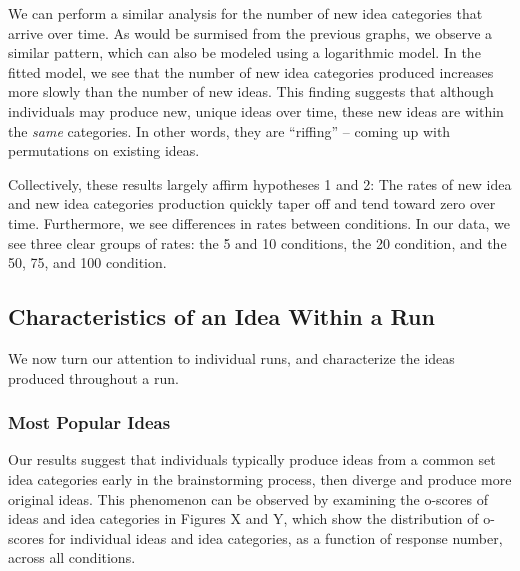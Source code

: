 
We can perform a similar analysis for the number of new idea categories that arrive over time. As would be surmised from the previous graphs, we observe a similar pattern, which can also be modeled using a logarithmic model. In the fitted model, we see that the number of new idea categories produced increases more slowly than the number of new ideas. This finding suggests that although individuals may produce new, unique ideas over time, these new ideas are within the \emph{same} categories. In other words, they are ``riffing'' -- coming up with permutations on existing ideas.

Collectively, these results largely affirm hypotheses 1 and 2: The rates of new idea and new idea categories production quickly taper off and tend toward zero over time. Furthermore, we see differences in rates between conditions. In our data, we see three clear groups of rates: the 5 and 10 conditions, the 20 condition, and the 50, 75, and 100 condition.



\subsection{Characteristics of an Idea Within a Run}
We now turn our attention to individual runs, and characterize the ideas produced throughout a run.

\subsubsection{Most Popular Ideas}
Our results suggest that individuals typically produce ideas from a common set idea categories early in the brainstorming process, then diverge and produce more original ideas. This phenomenon can be observed by examining the o-scores of ideas and idea categories in Figures X and Y, which show the distribution of o-scores for individual ideas and idea categories, as a function of response number, across all conditions.

